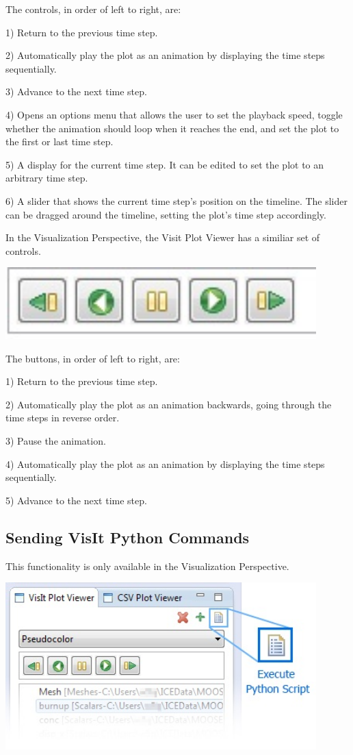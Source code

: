 The controls, in order of left to right, are:

1) Return to the previous time step.

2) Automatically play the plot as an animation by displaying the time steps
sequentially. 

3) Advance to the next time step. 

4) Opens an options menu that allows the user to set the playback speed, toggle
whether the animation should loop when it reaches the end, and set the plot to
the first or last time step.

5) A display for the current time step. It can be edited to set the plot to an
arbitrary time step. 

6) A slider that shows the current time step's position on the timeline. The
slider can be dragged around the timeline, setting the plot's time step
accordingly.

In the Visualization Perspective, the Visit Plot Viewer has a similiar set of
controls.

\begin{center}
\includegraphics[width=12cm]{images/VizPerspectiveTimeControls}
\end{center}

The buttons, in order of left to right, are:

1) Return to the previous time step.

2) Automatically play the plot as an animation backwards, going through the time
steps in reverse order.

3) Pause the animation.

4) Automatically play the plot as an animation by displaying the time steps
sequentially.

5) Advance to the next time step. 

\subsection{Sending VisIt Python Commands}

This functionality is only available in the Visualization Perspective.

\begin{center}
\includegraphics[width=12cm]{images/PythonScriptButton}
\end{center}

